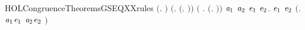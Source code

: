 \newcommand{\HOLCongruenceTheoremsGSEQXXind}{\UseVerbatim{HOLCongruenceTheoremsGSEQXXind}}
\begin{SaveVerbatim}{HOLCongruenceTheoremsGSEQXXrules}
\HOLTokenTurnstile{}  \ensuremath{(}\HOLTokenLambda{}. \ensuremath{)} \HOLSymConst{\HOLTokenConj{}} \ensuremath{(}\HOLSymConst{\HOLTokenForall{}}.  \ensuremath{(}\HOLTokenLambda{}. \ensuremath{)}\ensuremath{)} \HOLSymConst{\HOLTokenConj{}}
   \ensuremath{(}\HOLSymConst{\HOLTokenForall{}} .   \HOLSymConst{\HOLTokenImp{}}  \ensuremath{(}\HOLTokenLambda{}. \HOLSymConst{\ensuremath{\ldotp}} \ensuremath{)}\ensuremath{)} \HOLSymConst{\HOLTokenConj{}}
   \HOLSymConst{\HOLTokenForall{}}\ensuremath{\HOLBoundVar{a}\sb{\mathrm{1}}} \ensuremath{\HOLBoundVar{a}\sb{\mathrm{2}}} \ensuremath{\HOLBoundVar{e}\sb{\mathrm{1}}} \ensuremath{\HOLBoundVar{e}\sb{\mathrm{2}}}.
        \ensuremath{\HOLBoundVar{e}\sb{\mathrm{1}}} \HOLSymConst{\HOLTokenConj{}}  \ensuremath{\HOLBoundVar{e}\sb{\mathrm{2}}} \HOLSymConst{\HOLTokenImp{}}  \ensuremath{(}\HOLTokenLambda{}. \ensuremath{\HOLBoundVar{a}\sb{\mathrm{1}}}\HOLSymConst{\ensuremath{\ldotp}}\ensuremath{\HOLBoundVar{e}\sb{\mathrm{1}}}  \HOLSymConst{\ensuremath{+}} \ensuremath{\HOLBoundVar{a}\sb{\mathrm{2}}}\HOLSymConst{\ensuremath{\ldotp}}\ensuremath{\HOLBoundVar{e}\sb{\mathrm{2}}} \ensuremath{)}
\end{SaveVerbatim}
\newcommand{\HOLCongruenceTheoremsGSEQXXrules}{\UseVerbatim{HOLCongruenceTheoremsGSEQXXrules}}
